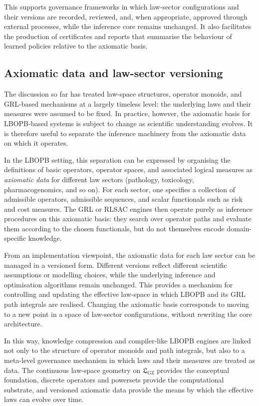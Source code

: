 \documentclass[11pt]{book}
\theoremstyle{plain}
\theoremstyle{definition}
\theoremstyle{remark}
\newcommand{\GZLS}{\ensuremath{\mathfrak{L}_{\mathrm{GZ}}}}       \newcommand{\GZLT}{\ensuremath{M_{!w}}}                           \newcommand{\GZLOC}{\ensuremath{A_M}}                             \newcommand{\GZLCurv}{\ensuremath{\mathcal{F}_{\mathrm{law}}}}
\begin{document}
This supports governance frameworks in which law-sector configurations
and their versions are recorded, reviewed, and, when appropriate,
approved through external processes, while the inference core remains
unchanged. It also facilitates the production of certificates and
reports that summarise the behaviour of learned policies relative to
the axiomatic basis.

\subsection*{Axiomatic data and law-sector versioning}


The discussion so far has treated law-space structures, operator
monoids, and GRL-based mechanisms at a largely timeless level: the
underlying laws and their measures were assumed to be fixed. In
practice, however, the axiomatic basis for LBOPB-based systems is
subject to change as scientific understanding evolves. It is therefore
useful to separate the inference machinery from the axiomatic data on
which it operates.

In the LBOPB setting, this separation can be expressed by organising
the definitions of basic operators, operator spaces, and associated
logical measures as \emph{axiomatic data} for different law sectors
(pathology, toxicology, pharmacogenomics, and so on). For each sector,
one specifies a collection of admissible operators, admissible
sequences, and scalar functionals such as risk and cost measures. The
GRL or RLSAC engines then operate purely as inference procedures on
this axiomatic basis: they search over operator paths and evaluate
them according to the chosen functionals, but do not themselves encode
domain-specific knowledge.

From an implementation viewpoint, the axiomatic data for each law
sector can be managed in a versioned form. Different versions reflect
different scientific assumptions or modelling choices, while the
underlying inference and optimisation algorithms remain unchanged.
This provides a mechanism for controlling and updating the effective
law-space in which LBOPB and its GRL path integrals are realised.
Changing the axiomatic basis corresponds to moving to a new point in
a space of law-sector configurations, without rewriting the core
architecture.

In this way, knowledge compression and compiler-like LBOPB engines are
linked not only to the structure of operator monoids and path
integrals, but also to a meta-level governance mechanism in which laws
and their measures are treated as data. The continuous law-space
geometry on $\GZLS$ provides the conceptual foundation, discrete
operators and powersets provide the computational substrate, and
versioned axiomatic data provide the means by which the effective laws
can evolve over time.
\end{document}
